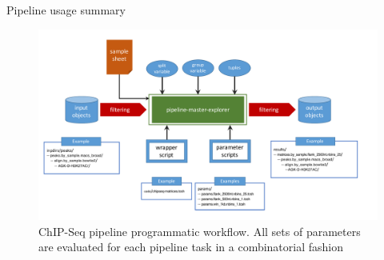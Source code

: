 \documentclass[final]{beamer}
\newlength{\onecolwid}
\begin{document}
\begin{frame}[t]
\begin{columns}[t]
\begin{column}{\onecolwid}
\begin{beamerboxesrounded}{Pipeline usage summary}
\begin{figure}
\includegraphics[width=1.0\linewidth]{./Figures/ChIPSeq_flowchart}
\caption{ChIP-Seq pipeline programmatic workflow. All sets of parameters are evaluated for each pipeline task in a combinatorial fashion}
\label{fig:flowchart}
\end{figure}
\end{beamerboxesrounded}\hfill

\begin{table}
\centering
{}
\caption{ChIP-Seq pipeline standard components. Internally developed methods listed in bold.}
\label{tab:toolkit}
\end{table}


\end{column} %


\end{columns}
\end{frame}
\end{document}
